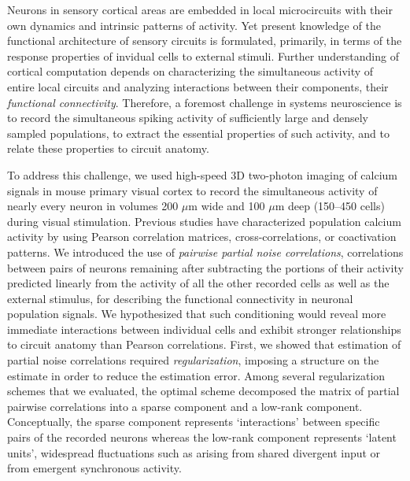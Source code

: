 Neurons in sensory cortical areas are embedded in local microcircuits with their own dynamics and intrinsic patterns of activity.  
Yet present knowledge of the functional architecture of sensory circuits is formulated, primarily, in terms of the response properties of invidual cells to external stimuli.
Further understanding of cortical computation depends on characterizing the simultaneous activity of entire local circuits and analyzing interactions between their components, \ie their \emph{functional connectivity}.
Therefore, a foremost challenge in systems neuroscience is to record the simultaneous spiking activity of sufficiently large and densely sampled populations, to extract the essential properties of such activity, and to relate these properties to circuit anatomy. 

To address this challenge, we used high-speed 3D two-photon imaging of calcium signals in mouse primary visual cortex to record the simultaneous activity of nearly every neuron in volumes 200 $\mu$m wide and 100 $\mu$m deep (150--450 cells) during visual stimulation. 
Previous studies have characterized population calcium activity by using Pearson correlation matrices, cross-correlations, or coactivation patterns.  
We introduced the use of \emph{pairwise partial noise correlations}, \ie correlations between pairs of neurons remaining after subtracting the portions of their activity predicted linearly from the activity of all the other recorded cells as well as the external stimulus, for describing the functional connectivity in neuronal population signals. 
We hypothesized that such conditioning would reveal more immediate interactions between individual cells and exhibit stronger relationships to circuit anatomy than Pearson correlations.
First, we showed that estimation of partial noise correlations required \emph{regularization}, \ie imposing a structure on the estimate in order to reduce the estimation error. 
Among several regularization schemes that we evaluated, the optimal scheme decomposed the matrix of partial pairwise correlations into a sparse component and a low-rank component. 
Conceptually, the sparse component represents `interactions' between specific pairs of the recorded neurons whereas the low-rank component represents `latent units', \ie widespread fluctuations such as arising from shared divergent input or from emergent synchronous activity.

